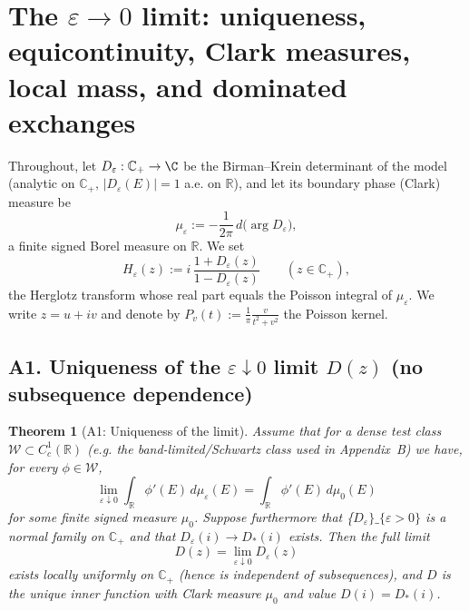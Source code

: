 ﻿\documentclass[12pt,a4paper]{article}
\newtheorem{theorem}{Theorem}[section]
\theoremstyle{definition}
\theoremstyle{remark}
\newcommand{\RR}{\mathbb{R}}
\begin{document}
\appendix

\section{The \texorpdfstring{$\varepsilon\to0$}{epsilon to 0} limit: uniqueness, equicontinuity, Clark measures, local mass, and dominated exchanges}

Throughout, let $D_\varepsilon:\mathbb{C}_+\to\C$ be the Birman--Krein determinant of the model (analytic on $\mathbb{C}_+$, $|D_\varepsilon(E)|=1$ a.e.
 on $\RR$), and let its boundary phase (Clark) measure be
\begin{equation*}
  \mu_\varepsilon:=-\frac{1}{2\pi}\, d\!\big(\arg D_\varepsilon\big),
\end{equation*}
a finite signed Borel measure on $\RR$. We set
\begin{equation*}
  H_\varepsilon(z):=i\,\frac{1+D_\varepsilon(z)}{1-D_\varepsilon(z)}\qquad (z\in\mathbb{C}_+),
\end{equation*}
the Herglotz transform whose real part equals the Poisson integral of $\mu_\varepsilon$. We write $z=u+iv$ and denote by $P_v(t):=\frac{1}{\pi}\frac{v}{t^2+v^2}$ the Poisson kernel.

\subsection{A1. Uniqueness of the \texorpdfstring{$\varepsilon\downarrow0$}{epsilon downarrow 0} limit \texorpdfstring{$D(z)$}{D(z)} (no subsequence dependence)}

\begin{theorem}[A1: Uniqueness of the limit]
\label{thm:A1}
Assume that for a dense test class $\mathcal W\subset C_c^1(\RR)$ (e.g.
 the band-limited/Schwartz class used in Appendix~B) we have, for every $\phi\in\mathcal W$,
\begin{equation*}
  \lim_{\varepsilon\downarrow0}\int_{\RR}\phi'(E)\,d\mu_\varepsilon(E)=\int_{\RR}\phi'(E)\,d\mu_0(E)
\end{equation*}
for some finite signed measure $\mu_0$. Suppose furthermore that {\{$D_\varepsilon\}\_\{\varepsilon>0\}$} is a normal family on $\mathbb{C}_+$ and that $D_\varepsilon(i)\to D_*(i)$ exists. Then the full limit
\begin{equation*}
  D(z)=\lim_{\varepsilon\downarrow0}D_\varepsilon(z)
\end{equation*}
exists locally uniformly on $\mathbb{C}_+$ (hence is independent of subsequences), and $D$ is the unique inner function with Clark measure $\mu_0$ and value $D(i)=D_*(i)$.
\end{theorem}
\end{document}
